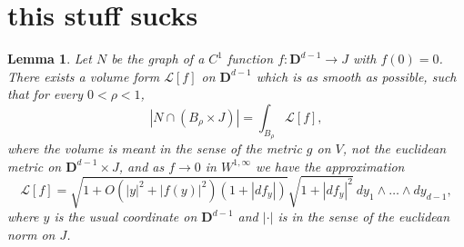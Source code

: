 \documentclass[reqno,12pt,letterpaper]{amsart}
\newcommand{\DD}{\mathbf{D}}
\newtheorem{lemma}[theorem]{Lemma}
\theoremstyle{definition}
\numberwithin{equation}{section}
\begin{document}
\section{this stuff sucks}
\begin{lemma}
Let $N$ be the graph of a $C^1$ function $f: \DD^{d - 1} \to J$ with $f(0) = 0$.
There exists a volume form $\mathscr L[f]$ on $\DD^{d - 1}$ which is as smooth as possible, such that for every $0 < \rho < 1$,
$$|N \cap (B_\rho \times J)| = \int_{B_\rho} \mathscr L[f],$$
where the volume is meant in the sense of the metric $g$ on $V$, not the euclidean metric on $\DD^{d - 1} \times J$,
and as $f \to 0$ in $W^{1, \infty}$ we have the approximation
\begin{equation}\label{Lagrangian with error}
\mathscr L[f] = \sqrt{1 + O(|y|^2 + |f(y)|^2)(1 + |df_y|)} \sqrt{1 + |df_y|^2} ~dy_1 \wedge \dots \wedge dy_{d - 1},
\end{equation}
where $y$ is the usual coordinate on $\DD^{d - 1}$ and $|\cdot|$ is in the sense of the euclidean norm on $J$.
\end{lemma}
\end{document}

